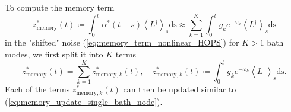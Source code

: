 To compute the memory term
\begin{equation*}
    z_\text{memory}^*(t) \coloneqq \int_0^t \alpha^*(t-s) \left\langle L^\dagger\right\rangle_s \text{ds}
    \approx \sum_{k=1}^{K} \int_0^t g_k e^{-\omega_k} \left\langle L^\dagger\right\rangle_s \text{ds}
\end{equation*}
in the "shifted" noise (\ref{eq:memory_term_nonlinear_HOPS}) for $K > 1$ bath modes, we first split it into
$K$ terms
\begin{equation*}
    z_\text{memory}^*(t) = \sum_{k=1}^{K} z_{\text{memory},k}^*(t), \quad z_{\text{memory},k}^*(t) \coloneqq \int_0^t g_k e^{-\omega_k} \left\langle L^\dagger\right\rangle_s \text{ds}.
\end{equation*}
Each of the terms $z_{\text{memory},k}^*(t)$ can then be updated similar to (\ref{eq:memory_update_single_bath_node}).